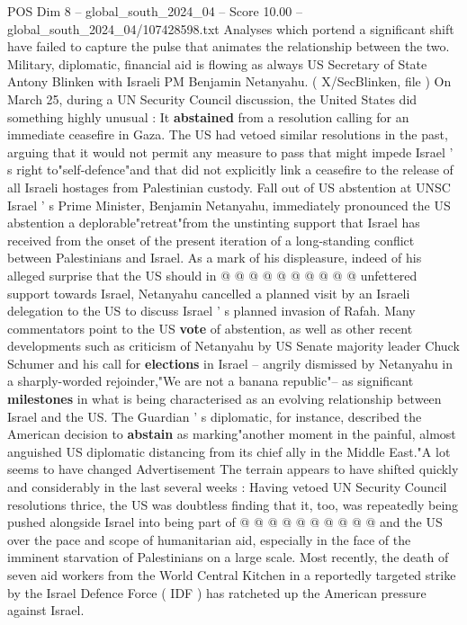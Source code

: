 \begin{textsample}{POS Dim 8 – global\_south\_2024\_04 – Score 10.00 – global\_south\_2024\_04/107428598.txt}  \label{ex:f8_pos_189}
Analyses which portend a significant shift have failed to capture the pulse that animates the relationship between the two.
Military, diplomatic, financial aid is flowing as always US Secretary of State Antony Blinken with Israeli PM Benjamin Netanyahu. ( X/SecBlinken, file ) On March 25, during a UN Security Council discussion, the United States did something highly unusual : It \textbf{abstained} from a resolution calling for an immediate ceasefire in Gaza.
The US had vetoed similar resolutions in the past, arguing that it would not permit any measure to pass that might impede Israel ' s right to"self-defence"and that did not explicitly link a ceasefire to the release of all Israeli hostages from Palestinian custody.
Fall out of US abstention at UNSC Israel ' s Prime Minister, Benjamin Netanyahu, immediately pronounced the US abstention a deplorable"retreat"from the unstinting support that Israel has received from the onset of the present iteration of a long-standing conflict between Palestinians and Israel.
As a mark of his displeasure, indeed of his alleged surprise that the US should in @ @ @ @ @ @ @ @ @ @ unfettered support towards Israel, Netanyahu cancelled a planned visit by an Israeli delegation to the US to discuss Israel ' s planned invasion of Rafah.
Many commentators point to the US \textbf{vote} of abstention, as well as other recent developments such as criticism of Netanyahu by US Senate majority leader Chuck Schumer and his call for \textbf{elections} in Israel -- angrily dismissed by Netanyahu in a sharply-worded rejoinder,"We are not a banana republic"-- as significant \textbf{milestones} in what is being characterised as an evolving relationship between Israel and the US.
The Guardian ' s diplomatic, for instance, described the American decision to \textbf{abstain} as marking"another moment in the painful, almost anguished US diplomatic distancing from its chief ally in the Middle East."A lot seems to have changed Advertisement The terrain appears to have shifted quickly and considerably in the last several weeks : Having vetoed UN Security Council resolutions thrice, the US was doubtless finding that it, too, was repeatedly being pushed alongside Israel into being part of @ @ @ @ @ @ @ @ @ @ and the US over the pace and scope of humanitarian aid, especially in the face of the imminent starvation of Palestinians on a large scale.
Most recently, the death of seven aid workers from the World Central Kitchen in a reportedly targeted strike by the Israel Defence Force ( IDF ) has ratcheted up the American pressure against Israel.

\end{textsample}
